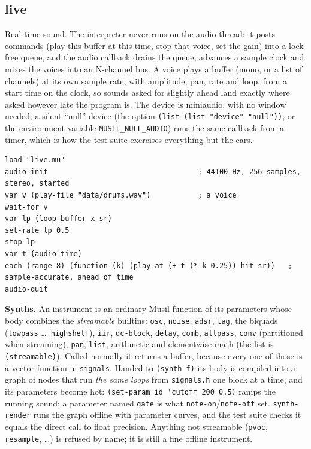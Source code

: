 \documentclass[11pt,a4paper]{article}
\newcommand{\musil}[1]{\lstinline[style=musilinline]{#1}}
\begin{document}


\subsection{live}

Real-time sound. The interpreter never runs on the audio thread: it posts commands
(play this buffer at this time, stop that voice, set the gain) into a lock-free queue,
and the audio callback drains the queue, advances a sample clock and mixes the voices
into an N-channel bus. A voice plays a buffer (mono, or a list of channels) at its own
sample rate, with amplitude, pan, rate and loop, from a start time on the clock, so
sounds asked for slightly ahead land exactly where asked however late the program is.
The device is miniaudio, with no window needed; a silent ``null'' device (the option
\musil{(list (list "device" "null"))}, or the environment variable
\texttt{MUSIL\_NULL\_AUDIO}) runs the same callback from a timer, which is how the test
suite exercises everything but the ears.

\begin{lstlisting}
load "live.mu"
audio-init                                   ; 44100 Hz, 256 samples, stereo, started
var v (play-file "data/drums.wav")           ; a voice
wait-for v
var lp (loop-buffer x sr)
set-rate lp 0.5
stop lp
var t (audio-time)
each (range 8) (function (k) (play-at (+ t (* k 0.25)) hit sr))   ; sample-accurate, ahead of time
audio-quit
\end{lstlisting}

\textbf{Synths.} An instrument is an ordinary Musil function of its parameters whose
body combines the \emph{streamable} builtins: \musil{osc}, \musil{noise}, \musil{adsr},
\musil{lag}, the biquads (\musil{lowpass} \ldots\ \musil{highshelf}), \musil{iir},
\musil{dc-block}, \musil{delay}, \musil{comb}, \musil{allpass}, \musil{conv} (partitioned
when streaming), \musil{pan}, \musil{list}, arithmetic and elementwise math (the list is
\musil{(streamable)}). Called normally it returns a buffer, because every one of those is
a vector function in \texttt{signals}. Handed to \musil{(synth f)} its body is compiled
into a graph of nodes that run \emph{the same loops} from \texttt{signals.h} one block at
a time, and its parameters become hot: \musil{(set-param id 'cutoff 200 0.5)} ramps the
running sound; a parameter named \musil{gate} is what \musil{note-on}/\musil{note-off}
set. \musil{synth-render} runs the graph offline with parameter curves, and the test suite
checks it equals the direct call to float precision. Anything not streamable
(\musil{pvoc}, \musil{resample}, \ldots) is refused by name; it is still a fine offline
instrument.
\end{document}
